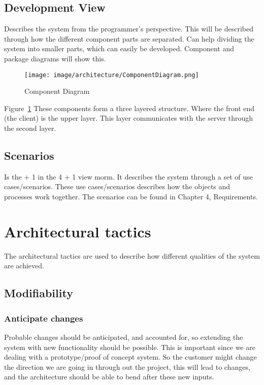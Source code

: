 \subsection{Development View}
Describes the system from the programmer's perspective. This will be described through how the different component parts are separated. Can help dividing the system into smaller parts, which can easily be developed. Component and package diagrams will show this.

\begin{figure}[h]
\centering
\texttt{[image: image/architecture/ComponentDiagram.png]}
\caption{Component Diagram}
\label{figure:ComponentDiagram}
\end{figure}

Figure~\ref{figure:ComponentDiagram} These components form a three layered structure. Where the front end (the client) is the upper layer. This layer communicates with the server through the second layer.


\subsection{Scenarios}
Is the + 1 in the 4 + 1 view morm. It describes the system through a set of use cases/scenarios. These use cases/scenarios describes how the objects and processes work together. The scenarios can be found in Chapter 4, Requirements.


\section{Architectural tactics} \label{Tactics}
The architectural tactics are used to describe how different qualities of the system are achieved.

\subsection{Modifiability}
\subsubsection{Anticipate changes}
Probable changes should be anticipated, and accounted for, so extending the system with new functionality should be possible. This is important since we are dealing with a prototype/proof of concept system. So the customer might change the direction we are going in through out the project, this will lead to changes, and the architecture should be able to bend after these new inputs.

